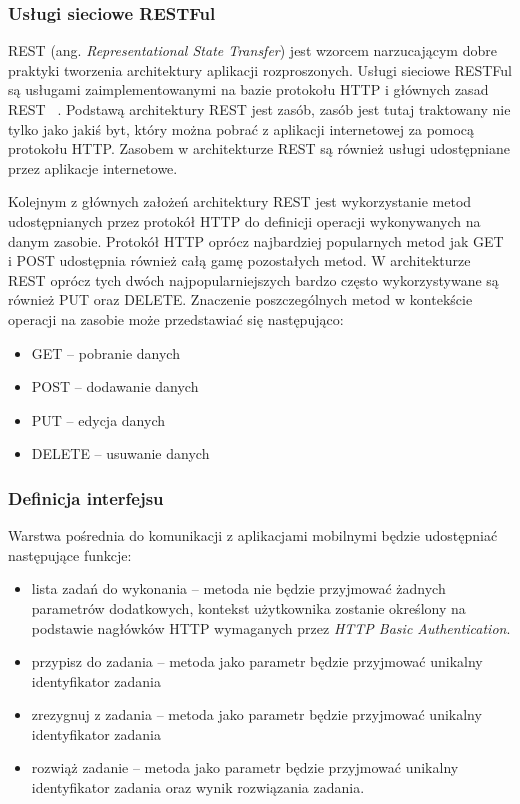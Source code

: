 \subsubsection{Usługi sieciowe RESTFul}

REST (ang. \textit{Representational State Transfer}) jest wzorcem narzucającym dobre praktyki tworzenia architektury aplikacji rozproszonych. Usługi sieciowe RESTFul  są usługami zaimplementowanymi na bazie protokołu HTTP i głównych zasad REST ~\cite{rest}.
Podstawą architektury REST jest zasób, zasób jest tutaj traktowany nie tylko jako jakiś byt, który można pobrać z aplikacji internetowej za pomocą protokołu HTTP. Zasobem w architekturze REST są również usługi udostępniane przez aplikacje internetowe.  

Kolejnym z głównych założeń architektury REST jest wykorzystanie metod udostępnianych przez protokół HTTP do definicji operacji wykonywanych na danym zasobie. Protokół HTTP oprócz najbardziej popularnych metod jak GET i POST udostępnia również całą gamę pozostałych metod. W architekturze REST oprócz tych dwóch najpopularniejszych bardzo często wykorzystywane są również PUT oraz DELETE. Znaczenie poszczególnych metod w kontekście operacji na zasobie może przedstawiać się następująco:
\begin{itemize}
\item GET -- pobranie danych
\item POST -- dodawanie danych
\item PUT -- edycja danych
\item DELETE -- usuwanie danych 
\end{itemize}


\subsubsection{Definicja interfejsu}

Warstwa pośrednia do komunikacji z aplikacjami mobilnymi będzie udostępniać następujące funkcje:

\begin{itemize}
\item lista zadań do wykonania -- metoda nie będzie przyjmować żadnych parametrów dodatkowych, kontekst użytkownika zostanie określony na podstawie nagłówków HTTP wymaganych przez \textit{HTTP Basic Authentication}. 
\item przypisz do zadania -- metoda jako parametr będzie przyjmować unikalny identyfikator zadania  
\item zrezygnuj z zadania -- metoda jako parametr będzie przyjmować unikalny identyfikator zadania  
\item rozwiąż zadanie -- metoda jako parametr będzie przyjmować unikalny identyfikator zadania  oraz wynik rozwiązania zadania. 
\end{itemize}


